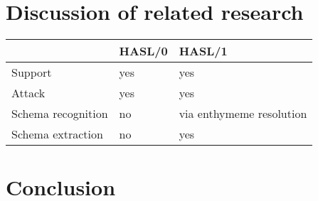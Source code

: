 \documentclass{IOS-Book-Article}
\begin{document}
\section{Discussion of related research}

\begin{table}
	\begin{tabular}{l|ll|}
		& HASL/0 & HASL/1  \\
		\hline
		Support & yes & yes \\
		Attack & yes & yes \\
		Schema recognition & no & via enthymeme resolution \\
		Schema extraction & no & yes
	\end{tabular}
\end{table}

\section{Conclusion}


%
%
%
%
%
%
%
%
%
%
%
%
%





\end{document}
